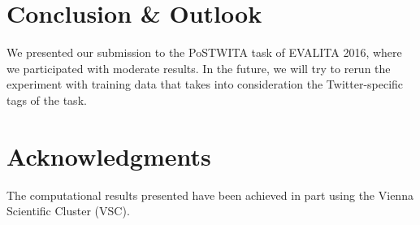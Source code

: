 \documentclass[11pt]{article}
\begin{document}
\section{Conclusion \& Outlook} %
\label{sec:conclusion}

We presented our submission to the PoSTWITA task of EVALITA 2016, where we
participated with moderate results. 
In the future, we will try to rerun the experiment with training data that
takes into consideration the Twitter-specific tags of the task.


\section*{Acknowledgments} %

The computational results presented have been achieved in part using the Vienna
Scientific Cluster (VSC).





\end{document}
